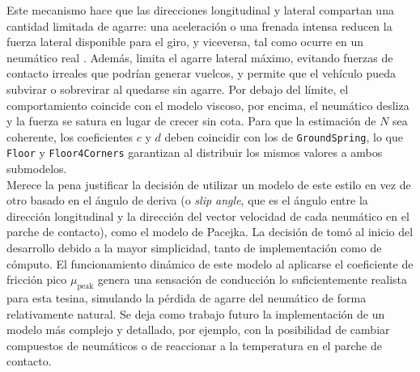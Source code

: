 Este mecanismo hace que las direcciones longitudinal y lateral compartan una cantidad limitada de agarre: una aceleración o una frenada intensa reducen la fuerza lateral disponible para el giro, y viceversa, tal como ocurre en un neumático real \cite{milliken1995,gillespie1992}. Además, limita el agarre lateral máximo, evitando fuerzas de contacto irreales que podrían generar vuelcos, y permite que el vehículo pueda subvirar o sobrevirar al quedarse sin agarre. Por debajo del límite, el comportamiento coincide con el modelo viscoso, por encima, el neumático desliza y la fuerza se satura en lugar de crecer sin cota. Para que la estimación de $N$ sea coherente, los coeficientes $c$ y $d$ deben coincidir con los de \verb|GroundSpring|, lo que \verb|Floor| y \verb|Floor4Corners| garantizan al distribuir los mismos valores a ambos submodelos.\\

Merece la pena justificar la decisión de utilizar un modelo de este estilo en vez de otro basado en el ángulo de deriva (o \textit{slip angle}, que es el ángulo entre la dirección longitudinal y la dirección del vector velocidad de cada neumático en el parche de contacto), como el modelo de Pacejka. La decisión de tomó al inicio del desarrollo debido a la mayor simplicidad, tanto de implementación como de cómputo. El funcionamiento dinámico de este modelo al aplicarse el coeficiente de fricción pico $\mu_\text{peak}$ genera una sensación de conducción lo suficientemente realista para esta tesina, simulando la pérdida de agarre del neumático de forma relativamente natural. Se deja como trabajo futuro la implementación de un modelo más complejo y detallado, por ejemplo, con la posibilidad de cambiar compuestos de neumáticos o de reaccionar a la temperatura en el parche de contacto.






